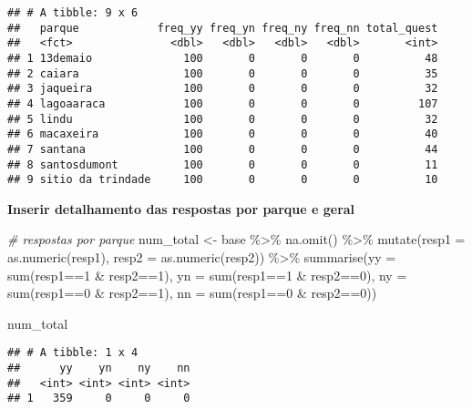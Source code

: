 \documentclass[
]{article}
\newenvironment{Shaded}{\begin{snugshade}}{\end{snugshade}}
\newcommand{\AttributeTok}[1]{\textcolor[rgb]{0.77,0.63,0.00}{#1}}
\newcommand{\CommentTok}[1]{\textcolor[rgb]{0.56,0.35,0.01}{\textit{#1}}}
\newcommand{\DecValTok}[1]{\textcolor[rgb]{0.00,0.00,0.81}{#1}}
\newcommand{\FunctionTok}[1]{\textcolor[rgb]{0.00,0.00,0.00}{#1}}
\newcommand{\NormalTok}[1]{#1}
\newcommand{\OtherTok}[1]{\textcolor[rgb]{0.56,0.35,0.01}{#1}}
\newcommand{\SpecialCharTok}[1]{\textcolor[rgb]{0.00,0.00,0.00}{#1}}
\begin{document}
\begin{verbatim}
## # A tibble: 9 x 6
##   parque            freq_yy freq_yn freq_ny freq_nn total_quest
##   <fct>               <dbl>   <dbl>   <dbl>   <dbl>       <int>
## 1 13demaio              100       0       0       0          48
## 2 caiara                100       0       0       0          35
## 3 jaqueira              100       0       0       0          32
## 4 lagoaaraca            100       0       0       0         107
## 5 lindu                 100       0       0       0          32
## 6 macaxeira             100       0       0       0          40
## 7 santana               100       0       0       0          44
## 8 santosdumont          100       0       0       0          11
## 9 sitio da trindade     100       0       0       0          10
\end{verbatim}

\textbf{Inserir detalhamento das respostas por parque e geral}

\begin{Shaded}
\begin{Highlighting}[]
\CommentTok{\# respostas por parque}
\NormalTok{num\_total }\OtherTok{\textless{}{-}}\NormalTok{ base }\SpecialCharTok{\%\textgreater{}\%} 
  \FunctionTok{na.omit}\NormalTok{() }\SpecialCharTok{\%\textgreater{}\%} 
  \FunctionTok{mutate}\NormalTok{(}\AttributeTok{resp1 =} \FunctionTok{as.numeric}\NormalTok{(resp1),}
         \AttributeTok{resp2 =} \FunctionTok{as.numeric}\NormalTok{(resp2)) }\SpecialCharTok{\%\textgreater{}\%} 
  \FunctionTok{summarise}\NormalTok{(}\AttributeTok{yy =} \FunctionTok{sum}\NormalTok{(resp1}\SpecialCharTok{==}\DecValTok{1} \SpecialCharTok{\&}\NormalTok{ resp2}\SpecialCharTok{==}\DecValTok{1}\NormalTok{),}
            \AttributeTok{yn =} \FunctionTok{sum}\NormalTok{(resp1}\SpecialCharTok{==}\DecValTok{1} \SpecialCharTok{\&}\NormalTok{ resp2}\SpecialCharTok{==}\DecValTok{0}\NormalTok{),}
            \AttributeTok{ny =} \FunctionTok{sum}\NormalTok{(resp1}\SpecialCharTok{==}\DecValTok{0} \SpecialCharTok{\&}\NormalTok{ resp2}\SpecialCharTok{==}\DecValTok{1}\NormalTok{),}
            \AttributeTok{nn =} \FunctionTok{sum}\NormalTok{(resp1}\SpecialCharTok{==}\DecValTok{0} \SpecialCharTok{\&}\NormalTok{ resp2}\SpecialCharTok{==}\DecValTok{0}\NormalTok{)) }

\NormalTok{num\_total}
\end{Highlighting}
\end{Shaded}

\begin{verbatim}
## # A tibble: 1 x 4
##      yy    yn    ny    nn
##   <int> <int> <int> <int>
## 1   359     0     0     0
\end{verbatim}
\end{document}
